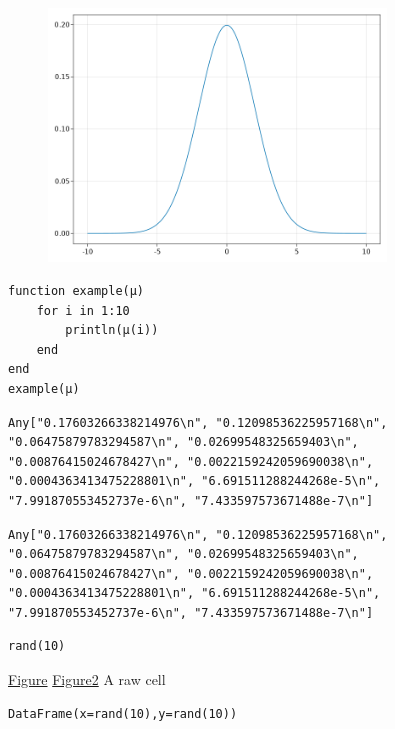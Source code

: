 \begin{figure}[H]
	\centering
	\includegraphics[width=0.8\textwidth]{./figures/jupyternotebook_figure2.png}
	\label{fig:jupyternotebook_figure2.png}

\end{figure}

\begin{lstlisting}[language=JuliaLocal, style=julia]
function example(μ)
    for i in 1:10
        println(μ(i))
    end
end
example(μ)
\end{lstlisting}

\begin{verbatim}
Any["0.17603266338214976\n", "0.12098536225957168\n", "0.06475879783294587\n", "0.02699548325659403\n", "0.00876415024678427\n", "0.0022159242059690038\n", "0.0004363413475228801\n", "6.691511288244268e-5\n", "7.991870553452737e-6\n", "7.433597573671488e-7\n"]
\end{verbatim}

\begin{verbatim}
Any["0.17603266338214976\n", "0.12098536225957168\n", "0.06475879783294587\n", "0.02699548325659403\n", "0.00876415024678427\n", "0.0022159242059690038\n", "0.0004363413475228801\n", "6.691511288244268e-5\n", "7.991870553452737e-6\n", "7.433597573671488e-7\n"]
\end{verbatim}

\begin{lstlisting}[language=JuliaLocal, style=julia]
rand(10)
\end{lstlisting}
\href{figure.svg}{Figure}  \href{plotexample.png}{Figure2} A raw cell 
\begin{lstlisting}[language=JuliaLocal, style=julia]
DataFrame(x=rand(10),y=rand(10))
\end{lstlisting}

